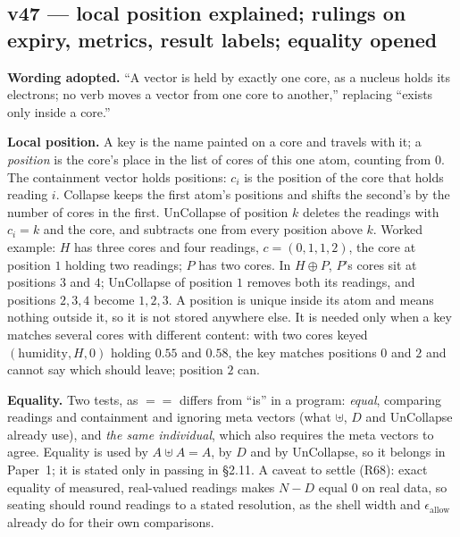 \documentclass[11pt]{article}
\begin{document}
\subsection*{v47 --- local position explained; rulings on expiry, metrics, result labels; equality opened}
\textbf{Wording adopted.} ``A vector is held by exactly one core, as a nucleus holds its electrons; no verb moves a vector from one core to another,'' replacing ``exists only inside a core.''

\textbf{Local position.} A key is the name painted on a core and travels with it; a \emph{position} is the core's place in the list of cores of this one atom, counting from $0$. The containment vector holds positions: $c_i$ is the position of the core that holds reading $i$.
Collapse keeps the first atom's positions and shifts the second's by the number of cores in the first. UnCollapse of position $k$ deletes the readings with $c_i=k$ and the core, and subtracts one from every position above $k$. Worked example: $H$ has three
cores and four readings, $c=(0,1,1,2)$, the core at position $1$ holding two readings; $P$ has two cores. In $H\oplus P$, $P$'s cores sit at positions $3$ and $4$; UnCollapse of position $1$ removes both its readings, and positions $2,3,4$ become $1,2,3$. A position is unique inside its atom
and means nothing outside it, so it is not stored anywhere else. It is needed only when a key matches several cores with different content: with two cores keyed $(\text{humidity},H,0)$ holding $0.55$ and $0.58$, the key matches positions $0$ and $2$ and cannot say which should leave; position $2$ can.

\textbf{Equality.} Two tests, as $==$ differs from ``is'' in a program: \emph{equal}, comparing readings and containment and ignoring meta vectors (what $\uplus$, $D$ and UnCollapse already use), and \emph{the same individual}, which also requires the meta vectors to agree. Equality is used by $A\uplus A=A$,
by $D$ and by UnCollapse, so it belongs in Paper~1; it is stated only in passing in \S2.11. A caveat to settle (R68): exact equality of measured, real-valued readings makes $N-D$ equal $0$ on real data, so seating should round readings to a stated resolution, as the shell width and $\epsilon_{\text{allow}}$ already do for their own comparisons.
\end{document}
